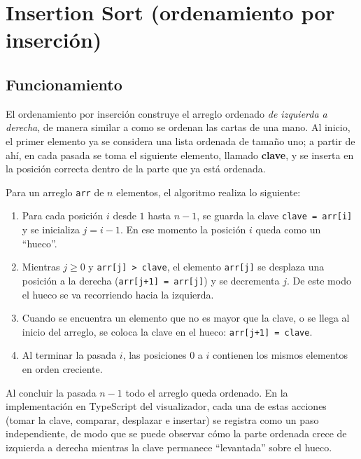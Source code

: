 
\section{Insertion Sort (ordenamiento por inserción)}

\subsection{Funcionamiento}

El ordenamiento por inserción construye el arreglo ordenado \emph{de izquierda a derecha}, de manera similar a como se ordenan las cartas de una mano. Al inicio, el primer elemento ya se considera una lista ordenada de tamaño uno; a partir de ahí, en cada pasada se toma el siguiente elemento, llamado \textbf{clave}, y se inserta en la posición correcta dentro de la parte que ya está ordenada.

Para un arreglo \texttt{arr} de $n$ elementos, el algoritmo realiza lo siguiente:

\begin{enumerate}
  \item Para cada posición $i$ desde $1$ hasta $n-1$, se guarda la clave \texttt{clave = arr[i]} y se inicializa $j = i - 1$. En ese momento la posición $i$ queda como un ``hueco''.
  \item Mientras $j \geq 0$ y \texttt{arr[j] > clave}, el elemento \texttt{arr[j]} se desplaza una posición a la derecha (\texttt{arr[j+1] = arr[j]}) y se decrementa $j$. De este modo el hueco se va recorriendo hacia la izquierda.
  \item Cuando se encuentra un elemento que no es mayor que la clave, o se llega al inicio del arreglo, se coloca la clave en el hueco: \texttt{arr[j+1] = clave}.
  \item Al terminar la pasada $i$, las posiciones $0$ a $i$ contienen los mismos elementos en orden creciente.
\end{enumerate}

Al concluir la pasada $n-1$ todo el arreglo queda ordenado. En la implementación en TypeScript del visualizador, cada una de estas acciones (tomar la clave, comparar, desplazar e insertar) se registra como un paso independiente, de modo que se puede observar cómo la parte ordenada crece de izquierda a derecha mientras la clave permanece ``levantada'' sobre el hueco.

